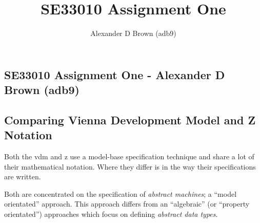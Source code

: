 \documentclass[a4paper, 10pt, notitlepage]{article}
\title{SE33010 Assignment One}
\author{Alexander D Brown (adb9)}
\begin{document}
\begin{centering}
\section*{SE33010 Assignment One - Alexander D Brown (adb9)}
\subsection*{Comparing Vienna Development Model and Z Notation}
\end{centering}

Both the \gls{vdm} and \gls{z} use a model-base specification technique and share a lot of their 
mathematical notation. Where they differ is in the way their specifications are written.

Both are concentrated on the specification of \textit{abstract machines}; a ``model orientated'' 
approach. This approach differs from an ``algebraic'' (or ``property orientated'') approaches
which focus on defining \textit{abstract data types}\cite{Hayes93vdmz}.



\end{document}
